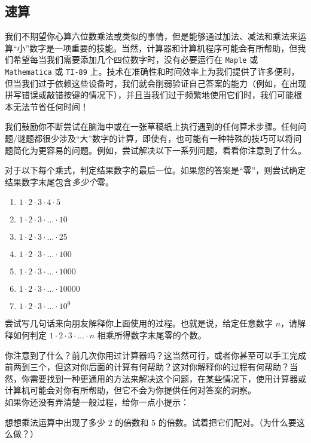\subsection{速算}

我们不期望你心算六位数乘法或类似的事情，但是能够通过加法、减法和乘法来运算``小''数字是一项重要的技能。当然，计算器和计算机程序可能会有所帮助，但我们希望每当我们需要添加几个四位数字时，没有必要运行在 \verb|Maple| 或 \verb|Mathematica| 或 \verb|TI-89| 上。技术在准确性和时间效率上为我们提供了许多便利，但当我们过于依赖这些设备时，我们就会削弱验证自己答案的能力（例如，在出现拼写错误或敲错按键的情况下），并且当我们过于频繁地使用它们时，我们可能根本无法节省任何时间！

我们鼓励你不断尝试在脑海中或在一张草稿纸上执行遇到的任何算术步骤。任何问题/谜题都很少涉及``大''数字的计算，即使有，也可能有一种特殊的技巧可以将问题简化为更容易的问题。例如，尝试解决以下一系列问题，看看你注意到了什么。

\begin{problem}
    对于以下每个乘式，判定结果数字的最后一位。如果您的答案是``零''，则尝试确定结果数字末尾包含\emph{多少个}零。
    \begin{enumerate}
        \item $1 \cdot 2 \cdot 3 \cdot 4 \cdot 5$
        \item $1 \cdot 2 \cdot 3 \cdot \dots \cdot 10$
        \item $1 \cdot 2 \cdot 3 \cdot \dots \cdot 25$
        \item $1 \cdot 2 \cdot 3 \cdot \dots \cdot 100$
        \item $1 \cdot 2 \cdot 3 \cdot \dots \cdot 1000$
        \item $1 \cdot 2 \cdot 3 \cdot \dots \cdot 10000$
        \item $1 \cdot 2 \cdot 3 \cdot \dots \cdot 10^9$
    \end{enumerate}
    尝试写几句话来向朋友解释你上面使用的过程。也就是说，给定任意数字 $n$，请解释如何判定 $1\cdot2\cdot3\cdot \dots \cdot n$ 相乘所得数字末尾零的个数。
\end{problem}

你注意到了什么？前几次你用过计算器吗？这当然可行，或者你甚至可以手工完成前两到三个，但这对你后面的计算有何帮助？这对你解释你的过程有何帮助？当然，你需要找到一种更通用的方法来解决这个问题，在某些情况下，使用计算器或计算机可能会对你有所帮助，但它不会为你提供任何对答案的洞察。\\
如果你还没有弄清楚一般过程，给你一点小提示：
\begin{hint}
    想想乘法运算中出现了多少 $2$ 的倍数和 $5$ 的倍数。试着把它们配对。（为什么要这么做？）
\end{hint}
